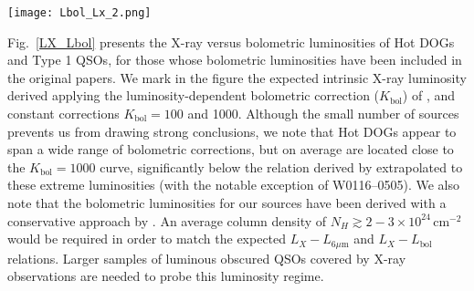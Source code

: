 \documentclass[useAMS,usenatbib]{mnras}
\newcommand*{\nhunits}{\mathrm{cm^{-2}}}
\begin{document}
\begin{figure*} 
	\centering
	\texttt{[image: Lbol\_Lx\_2.png]}
	\caption{Intrinsic X-ray luminosity versus bolometric luminosity for Hot DOGs. Blue and black symbols represent individual sources presented in this work or collected from the literature, if $L_{\mathrm{bol}}$ is reported in the original paper. See Appendix~\ref{appendix} for the analysis on W2026+0716. Error bars are given at 68\% confidence level. Downward pointing arrows represent upper limits on the X-ray luminosities at 90\% confidence level. The average X-ray luminosity for the stacked sources (derived from Fig.~\ref{L_NH} assuming a column density of $N_H=10^{24}\,\nhunits$) is marked at their median $L_{\mathrm{bol}}$ with a blue star. We also add for comparison three luminous optical Type 1 QSOs collected by \citet{Martocchia17} and originally presented by \citet{Cano-Diaz12}, \citet{Feruglio14}, and \citet{Banerji15}. The luminosity-dependent relation between $L_X$ and $L_{\mathrm{bol}}$ of \citet{Lusso12} is reported for reference, as well as the expected $L_X$ assuming constant bolometric corrections of $K_{\mathrm{bol}}=100$ and 1000.
	}
	\label{LX_Lbol}
\end{figure*}


Fig.~\ref{LX_Lbol} presents the X-ray versus bolometric luminosities of Hot DOGs and Type 1 QSOs, for those whose  bolometric luminosities have been included in the original papers. We mark in the figure the expected intrinsic \mbox{X-ray} luminosity derived applying the luminosity-dependent bolometric correction ($K_{\mathrm{bol}}$) of \cite{Lusso12}, and constant corrections $K_{\mathrm{bol}}=100$ and 1000.
Although the small number of sources prevents us from drawing strong conclusions, we note that Hot DOGs appear to span a wide range of bolometric corrections, but on average are located close to the $K_{\mathrm{bol}}=1000$ curve, significantly below the relation derived by \cite{Lusso12} extrapolated to these extreme luminosities (with the notable exception of W0116--0505). We also note that the bolometric luminosities for our sources have been derived with a conservative approach by \citet[see their section 3.3]{Tsai15}.
An average column density of $N_H\gtrsim2-3\times10^{24}\,\nhunits$ would be required in order to match the expected $L_X-L_{6\mu\mathrm{m}}$ and $L_X-L_{\mathrm{bol}}$ relations. Larger samples of luminous obscured QSOs covered by X-ray observations are needed to probe this luminosity regime.
\end{document}
